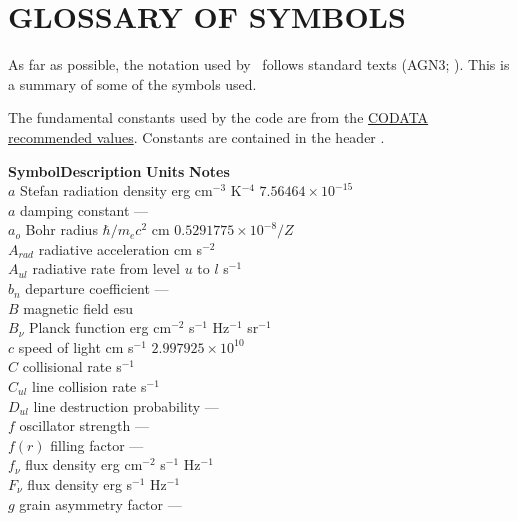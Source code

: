 \chapter{GLOSSARY OF SYMBOLS}

As far as possible, the notation used by \Hazy\ follows
standard texts (AGN3; \citealp{Mihalas1978}).
This is a summary of some of the symbols used.

The fundamental constants used by the code are from the
\href{http://physics.nist.gov/cuu/Constants/index.html}{
CODATA recommended values}.
Constants are contained in the header .

\begin{tabbing}
  \textbf{Symbol}\quad \= \textbf{Description}\hspace{10em} \= \textbf{Units}\hspace{8em} \=
  \textbf{Notes}\quad\quad \\
  $a$ \>  Stefan radiation density \>   erg cm$^{-3}$ K$^{-4}$ \>
$7.56464\times 10^{-15}$\\
$a$ \>  damping constant \>   ---\\
$a_o$ \>  Bohr radius \>  $\hbar
/{m_e}{c^2}$ cm \>  $0.5291775\times 10^{-8}/Z$\\
$A_{rad}$ \>   radiative acceleration \>  cm s$^{-2}$\\
$A_{ul}$ \>  radiative rate from level $u$ to $l$ \>  s$^{-1}$\\
 $b_n$ \>  departure coefficient \> ---\\
$B$ \>  magnetic field \>  esu \>  \\
$B_\nu$ \>  Planck function \>  erg cm$^{-2}$ s$^{-1}$ Hz$^{-1}$ sr$^{-1}$\\
$c$ \>   speed of
light \>  cm s$^{-1}$ \>   $2.997925\times 10^{10}$\\
$C$ \>  collisional rate \>  s$^{-1}$\\
$C_{ul}$ \>  line collision rate \>  s$^{-1}$\\
$D_{ul}$ \>  line destruction probability \> ---\\
$f$ \>  oscillator strength\> ---\\
$f(r)$ \>  filling factor \> --- \> \\
$f_\nu$ \>  flux density \>  erg cm$^{-2}$ s$^{-1}$ Hz$^{-1}$\\
$F_\nu$ \>  flux density \>  erg s$^{-1}$
Hz$^{-1}$\\
$g$ \>  grain asymmetry factor \> ---\\

\end{tabbing}
